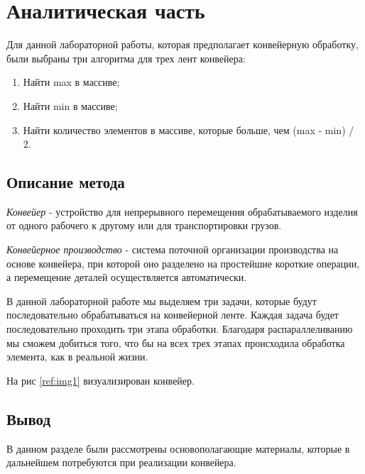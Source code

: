 \chapter{Аналитическая часть}

Для данной лабораторной работы, которая предполагает конвейерную обработку,
были выбраны три алгоритма для трех лент конвейера:

\begin{enumerate}
	\item Найти max в массиве;
	\item Найти min в массиве;
	\item Найти количество элементов в массиве, которые больше,
	      чем (max - min) / 2.
\end{enumerate}

\section{Описание метода}

\textit{Конвейер} - устройство для непрерывного перемещения обрабатываемого
изделия от одного рабочего к другому или для транспортировки грузов.

\textit{Конвейерное производство} - система поточной организации производства на основе конвейера,
при которой оно разделено на простейшие короткие операции, а перемещение деталей осуществляется автоматически.

В данной лабораторной работе мы выделяем три задачи, которые будут
последовательно обрабатываться на конвейерной ленте. Каждая задача
будет последовательно проходить три этапа обработки. Благодаря
распараллеливанию мы сможем добиться того, что бы на всех трех
этапах происходила обработка элемента, как в реальной жизни.

На рис \ref{ref:img1} визуализирован конвейер.

\begin{figure}[ht!]
\end{figure}


\section{Вывод}

В данном разделе были рассмотрены
основополагающие материалы, которые в дальнейшем потребуются
при реализации конвейера.
